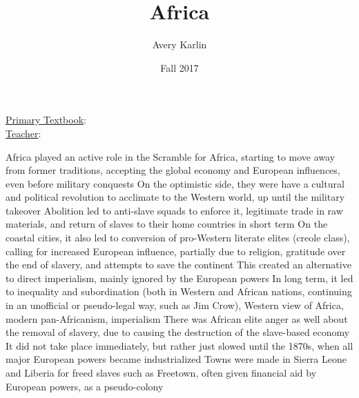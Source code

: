 \documentclass[11 pt, twoside]{article}
\newenvironment{outline*}
{
	\begin{outline}[enumerate]
	}
	{\end{outline}
}
\begin{document}
\title{Africa}
\author{Avery Karlin}
\date{Fall 2017}
\newcommand{\textbook}{}
\newcommand{\teacher}{}

\maketitle
\newpage
\hypertarget{content}{\tableofcontents}
\vspace{11pt}
\noindent
\underline{Primary Textbook}: \textbook\\
\underline{Teacher}: \teacher
\newpage

\begin{outline*}
\1 Africa played an active role in the Scramble for Africa, starting to move away from former traditions, accepting the global economy and European influences, even before military conquests
	\2 On the optimistic side, they were have a cultural and political revolution to acclimate to the Western world, up until the military takeover
\1 Abolition led to anti-slave squads to enforce it, legitimate trade in raw materials, and return of slaves to their home countries in short term
	\2 On the coastal cities, it also led to conversion of pro-Western literate elites (creole class), calling for increased European influence, partially due to religion, gratitude over the end of slavery, and attempts to save the continent
		\3 This created an alternative to direct imperialism, mainly ignored by the European powers
	\2 In long term, it led to inequality and subordination (both in Western and African nations, continuing in an unofficial or pseudo-legal way, such as Jim Crow), Western view of Africa, modern pan-Africanism, imperialism
		\3 There was African elite anger as well about the removal of slavery, due to causing the destruction of the slave-based economy
	\2 It did not take place immediately, but rather just slowed until the 1870s, when all major European powers became industrialized
	\2 Towns were made in Sierra Leone and Liberia for freed slaves such as Freetown, often given financial aid by European powers, as a pseudo-colony
\end{outline*}
\end{document}
